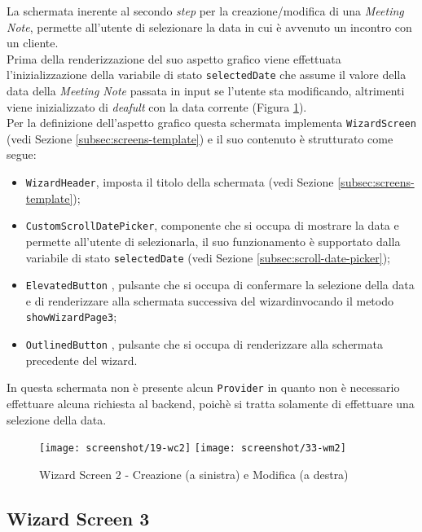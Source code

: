 La schermata inerente al secondo \emph{step} per la creazione/modifica di una \emph{Meeting Note}, permette all'utente di selezionare la data in cui è avvenuto un incontro con un cliente. \\
Prima della renderizzazione del suo aspetto grafico viene effettuata l'inizializzazione della variabile di stato \lstinline{selectedDate} che assume il valore della data della \emph{Meeting Note} passata in input se l'utente sta modificando, altrimenti viene inizializzato di \emph{deafult} con la data corrente (Figura \ref{fig:w2}). \\
Per la definizione dell'aspetto grafico questa schermata implementa \lstinline{WizardScreen} (vedi Sezione \ref{subsec:screens-template}) e il suo contenuto è strutturato come segue:
\begin{itemize}
    \item \lstinline{WizardHeader}, imposta il titolo della schermata (vedi Sezione \ref{subsec:screens-template});
    \item \lstinline{CustomScrollDatePicker}, componente che si occupa di mostrare la data e permette all'utente di selezionarla, il suo funzionamento è supportato dalla variabile di stato \lstinline{selectedDate} (vedi Sezione \ref{subsec:scroll-date-picker});
    \item \lstinline{ElevatedButton} \cite{site:elevated-button}, pulsante che si occupa di confermare la selezione della data e di renderizzare alla schermata successiva del \gls{wizard}\glsoccur invocando il metodo \lstinline{showWizardPage3};
    \item \lstinline{OutlinedButton} \cite{site:outline-button}, pulsante che si occupa di renderizzare alla schermata precedente del \gls{wizard}\glsoccur.
\end{itemize}
In questa schermata non è presente alcun \lstinline{Provider} in quanto non è necessario effettuare alcuna richiesta al \gls{backend}\glsoccur, poichè si tratta solamente di effettuare una selezione della data.

\begin{figure}[!h] 
    \centering 
    \texttt{[image: screenshot/19-wc2]}
    \hfill
    \texttt{[image: screenshot/33-wm2]} 
    \caption{Wizard Screen 2 - Creazione (a sinistra) e Modifica (a destra)}
    \label{fig:w2}
\end{figure}

\subsection{Wizard Screen 3}
\label{subsec:wizard-screen-3}

